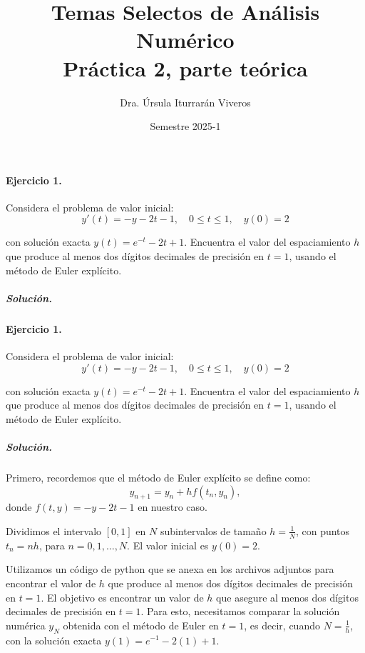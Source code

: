 \documentclass[12pt,letterpaper,oneside]{article}
\title{Temas Selectos de Análisis Numérico\\Práctica 2, parte teórica}
\author{Dra. Úrsula Iturrarán Viveros}
\date{Semestre 2025-1}
\begin{document}
\maketitle

\paragraph*{Ejercicio 1.} Considera el problema de valor inicial:
\begin{equation}
y'(t) = -y-2t-1,\quad 0\leq t\leq 1,\quad y(0) = 2 \label{eq-1}
\end{equation}

\noindent con solución exacta $y(t) = e^{-t} - 2t + 1$. Encuentra el valor del espaciamiento $h$ que produce al menos dos dígitos decimales de precisión en $t=1$, usando el método de Euler explícito.

\subparagraph*{Solución.}

\paragraph*{Ejercicio 1.} Considera el problema de valor inicial:
\begin{equation}
y'(t) = -y - 2t - 1, \quad 0 \leq t \leq 1, \quad y(0) = 2 \label{eq-1}
\end{equation}

\noindent con solución exacta \( y(t) = e^{-t} - 2t + 1 \). Encuentra el valor del espaciamiento \( h \) que produce al menos dos dígitos decimales de precisión en \( t = 1 \), usando el método de Euler explícito.

\subparagraph*{Solución.}
Primero, recordemos que el método de Euler explícito se define como:
\[
y_{n+1} = y_n + h f(t_n, y_n),
\]
donde \( f(t, y) = -y - 2t - 1 \) en nuestro caso.

Dividimos el intervalo \( [0, 1] \) en \( N \) subintervalos de tamaño \( h = \frac{1}{N} \), con puntos \( t_n = nh \), para \( n = 0, 1, \dots, N \). El valor inicial es \( y(0) = 2 \).

Utilizamos un código de python que se anexa en los archivos adjuntos para encontrar el valor de \( h \) que produce al menos dos dígitos decimales de precisión en \( t = 1 \).
El objetivo es encontrar un valor de \( h \) que asegure al menos dos dígitos decimales de precisión en \( t = 1 \). Para esto, necesitamos comparar la solución numérica \( y_N \) obtenida con el método de Euler en \( t = 1 \), es decir, cuando \( N = \frac{1}{h} \), con la solución exacta \( y(1) = e^{-1} - 2(1) + 1 \).
\end{document}
